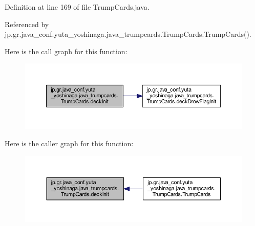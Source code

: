Definition at line 169 of file Trump\+Cards.\+java.



Referenced by jp.\+gr.\+java\+\_\+conf.\+yuta\+\_\+yoshinaga.\+java\+\_\+trumpcards.\+Trump\+Cards.\+Trump\+Cards().

Here is the call graph for this function\+:
\nopagebreak
\begin{figure}[H]
\begin{center}
\leavevmode
\includegraphics[width=350pt]{classjp_1_1gr_1_1java__conf_1_1yuta__yoshinaga_1_1java__trumpcards_1_1_trump_cards_af1a1d8299e1e79a272351c9e4b4026fa_cgraph}
\end{center}
\end{figure}
Here is the caller graph for this function\+:
\nopagebreak
\begin{figure}[H]
\begin{center}
\leavevmode
\includegraphics[width=350pt]{classjp_1_1gr_1_1java__conf_1_1yuta__yoshinaga_1_1java__trumpcards_1_1_trump_cards_af1a1d8299e1e79a272351c9e4b4026fa_icgraph}
\end{center}
\end{figure}
\mbox{\label{classjp_1_1gr_1_1java__conf_1_1yuta__yoshinaga_1_1java__trumpcards_1_1_trump_cards_a762812743e7d271596147b7dbcdd4ada}} 
